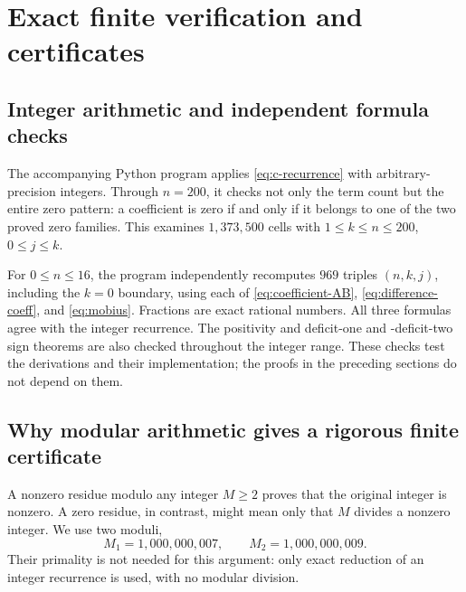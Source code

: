 \documentclass[11pt]{article}
\numberwithin{equation}{section}
\theoremstyle{definition}
\theoremstyle{remark}
\begin{document}
\section{Exact finite verification and certificates}\label{sec:computation}
\subsection{Integer arithmetic and independent formula checks}
The accompanying Python program applies \eqref{eq:c-recurrence} with
arbitrary-precision integers. Through $n=200$, it checks not only the
term count but the entire zero pattern: a coefficient is zero if and only
if it belongs to one of the two proved zero families. This examines
$1{,}373{,}500$ cells with $1\le k\le n\le200$, $0\le j\le k$.

For $0\le n\le16$, the program independently recomputes $969$ triples
$(n,k,j)$, including the $k=0$ boundary, using each of
\eqref{eq:coefficient-AB}, \eqref{eq:difference-coeff}, and
\eqref{eq:mobius}. Fractions are exact rational numbers. All three formulas
agree with the integer recurrence. The positivity and deficit-one and
-deficit-two sign theorems are also checked throughout the integer range.
These checks test the derivations and their implementation; the proofs in
the preceding sections do not depend on them.

\subsection{Why modular arithmetic gives a rigorous finite certificate}
A nonzero residue modulo any integer $M\ge2$ proves that the original
integer is nonzero. A zero residue, in contrast, might mean only that
$M$ divides a nonzero integer. We use two moduli,
\begin{equation}\label{eq:moduli}
 M_1=1{,}000{,}000{,}007,\qquad M_2=1{,}000{,}000{,}009.
\end{equation}
Their primality is not needed for this argument: only exact reduction of
an integer recurrence is used, with no modular division.
\end{document}
